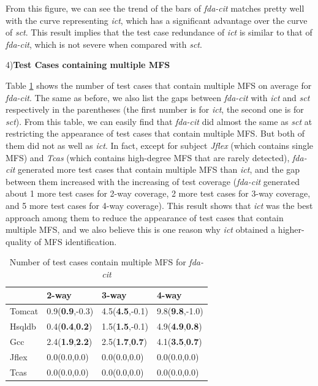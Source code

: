 \documentclass[10pt,journal,compsoc]{IEEEtran}
\begin{document}
From this figure, we can see the trend of the bars of \emph{fda-cit} matches pretty well with the curve representing \emph{ict}, which has a significant advantage over the curve of \emph{sct}. This result implies that the test case redundance of \emph{ict} is similar to that of \emph{fda-cit}, which is not severe when compared with \emph{sct}.


4)\textbf{Test Cases containing multiple MFS}

Table \ref{multi-fda-cit} shows the number of test cases that contain multiple MFS on average for \emph{fda-cit}. The same as before, we also list the gaps between \emph{fda-cit} with \emph{ict} and \emph{sct} respectively in the parentheses (the first number is for \emph{ict}, the second one is for \emph{sct}). From this table, we can easily find that \emph{fda-cit} did almost the same as \emph{sct} at restricting the appearance of test cases that contain multiple MFS. But both of them did not as well as \emph{ict}. In fact, except for subject \emph{Jflex} (which contains single MFS) and \emph{Tcas} (which contains high-degree MFS that are rarely detected), \emph{fda-cit} generated more test cases that contain multiple MFS than \emph{ict}, and the gap between them increased with the increasing of test coverage (\emph{fda-cit} generated about 1 more test cases for 2-way coverage, 2 more test cases for 3-way coverage, and 5 more test cases for 4-way coverage). This result shows that \emph{ict} was the best approach among them to reduce the appearance of test cases that contain multiple MFS, and we also believe this is one reason why \emph{ict} obtained a higher-quality of MFS identification.


\begin{table}[ht]
\caption{Number of test cases contain multiple MFS for \emph{fda-cit}}
\label{multi-fda-cit}
\centering
    \begin{tabular}{|l|l|l|l|}
    \hline
                   & 2-way                    & 3-way                      & 4-way                       \\ \hline
Tomcat	&0.9(\textbf{0.9},-0.3)	&4.5(\textbf{4.5},-0.1)	&9.8(\textbf{9.8},-1.0)	\\
Hsqldb	&0.4(\textbf{0.4},\textbf{0.2})	&1.5(\textbf{1.5},-0.1)	&4.9(\textbf{4.9},\textbf{0.8})	\\
Gcc	&2.4(\textbf{1.9},\textbf{2.2})	&2.5(\textbf{1.7},\textbf{0.7})	&4.1(\textbf{3.5},\textbf{0.7})	\\
Jflex	&0.0(0.0,0.0)	&0.0(0.0,0.0)	&0.0(0.0,0.0)	\\
Tcas	&0.0(0.0,0.0)	&0.0(0.0,0.0)	&0.0(0.0,0.0)	\\\hline
    \end{tabular}
\end{table}
\end{document}
